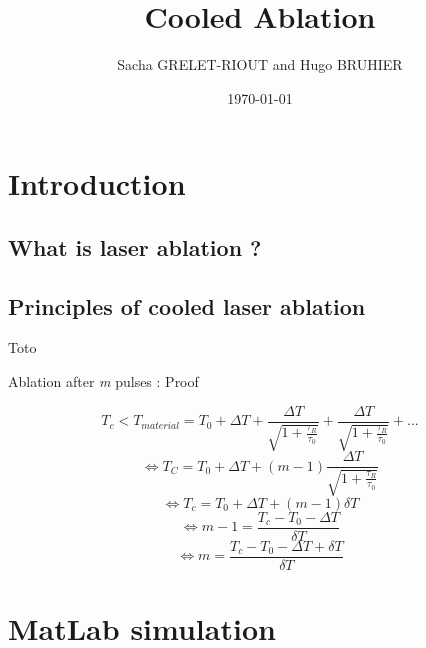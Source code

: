 \documentclass[11pt]{beamer}
\author{Sacha GRELET-RIOUT and Hugo BRUHIER}
\title{Cooled Ablation}
\institute{Télécom Saint-Étienne}
\date{\today}
\begin{document}
\begin{frame}
\titlepage
\end{frame}

\begin{frame}
\tableofcontents
\end{frame}

\section{Introduction}
\subsection{What is laser ablation ?}
\begin{frame}{}

\end{frame}

\subsection{Principles of cooled laser ablation}
\begin{frame}{Toto}

\end{frame}

\begin{frame}{Ablation after \emph{m} pulses : Proof}

$$
T_c < T_{material} = T_0 + \Delta T + \frac{\Delta T}{\sqrt{1+\frac{\tau_R}{\tau_0}}} + \frac{\Delta T}{\sqrt{1+\frac{\tau_R}{\tau_0}}} + ...
$$
$$
\Leftrightarrow T_C = T_0 + \Delta T + (m-1) \frac{\Delta T}{\sqrt{1+\frac{\tau_R}{\tau_0}}}
$$
$$
\Leftrightarrow T_c = T_0 + \Delta T + (m-1) \delta T
$$
$$
\Leftrightarrow m-1 = \frac{T_c - T_0 - \Delta T}{\delta T}
$$
\begin{equation}
\Leftrightarrow \boxed{m = \frac{T_c - T_0 - \Delta T + \delta T}{\delta T}}
\end{equation}


\end{frame}


\section{MatLab simulation}
\end{document}
